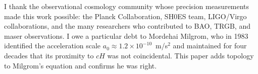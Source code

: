 \documentclass[aps,prd,preprint,superscriptaddress,showpacs,preprintnumbers,amsmath,amssymb,nofootinbib]{revtex4-2}
\begin{document}
\begin{acknowledgments}
I thank the observational cosmology community whose precision measurements made this work possible: the Planck Collaboration, SH0ES team, LIGO/Virgo collaborations, and the many researchers who contributed to BAO, TRGB, and maser observations. I owe a particular debt to Mordehai Milgrom, who in 1983 identified the acceleration scale $a_0 \approx 1.2 \times 10^{-10}$~m/s$^2$ and maintained for four decades that its proximity to $cH$ was not coincidental. This paper adds topology to Milgrom's equation and confirms he was right.
\end{acknowledgments}
\end{document}
